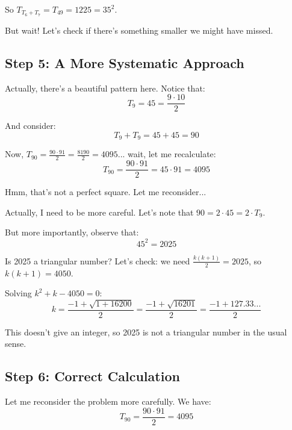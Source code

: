 \documentclass[12pt]{article}
\begin{document}
So $T_{T_6 + T_7} = T_{49} = 1225 = 35^2$.

But wait! Let's check if there's something smaller we might have missed.

\subsection*{Step 5: A More Systematic Approach}

Actually, there's a beautiful pattern here. Notice that:
\begin{equation}
T_9 = 45 = \frac{9 \cdot 10}{2}
\end{equation}

And consider:
\begin{equation}
T_9 + T_9 = 45 + 45 = 90
\end{equation}

Now, $T_{90} = \frac{90 \cdot 91}{2} = \frac{8190}{2} = 4095$... wait, let me recalculate:
\begin{equation}
T_{90} = \frac{90 \cdot 91}{2} = 45 \cdot 91 = 4095
\end{equation}

Hmm, that's not a perfect square. Let me reconsider...

Actually, I need to be more careful. Let's note that $90 = 2 \cdot 45 = 2 \cdot T_9$.

But more importantly, observe that:
\begin{equation}
45^2 = 2025
\end{equation}

Is 2025 a triangular number? Let's check: we need $\frac{k(k+1)}{2} = 2025$, so $k(k+1) = 4050$.

Solving $k^2 + k - 4050 = 0$:
\begin{equation}
k = \frac{-1 + \sqrt{1 + 16200}}{2} = \frac{-1 + \sqrt{16201}}{2} = \frac{-1 + 127.33...}{2}
\end{equation}

This doesn't give an integer, so 2025 is not a triangular number in the usual sense.

\subsection*{Step 6: Correct Calculation}

Let me reconsider the problem more carefully. We have:
\begin{equation}
T_{90} = \frac{90 \cdot 91}{2} = 4095
\end{equation}
\end{document}
